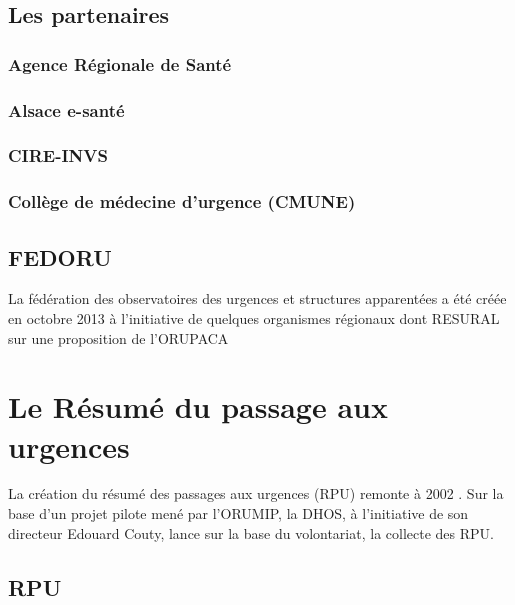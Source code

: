 \documentclass[12pt,english,french,twoside]{book}\usepackage[]{graphicx}\usepackage[]{color}
\begin{document}
\section*{Les partenaires}

  \subsection*{Agence Régionale de Santé}
    
  \subsection*{Alsace e-santé}
    
  \subsection*{CIRE-INVS}
    
  \subsection*{Collège de médecine d'urgence (CMUNE)}

\section*{FEDORU}
  
La fédération des observatoires des urgences et structures apparentées a été créée en octobre 2013 à l'initiative de quelques organismes régionaux dont RESURAL sur une proposition de l'ORUPACA 


\newpage
\chapter{Le Résumé du passage aux urgences}



La création du résumé des passages aux urgences (RPU) remonte à 2002 \cite{11}. Sur la base d'un projet pilote mené par l'ORUMIP, la DHOS, à l'initiative de son directeur Edouard Couty, lance sur la base du volontariat, la collecte des RPU.

\section*{RPU}
\end{document}
